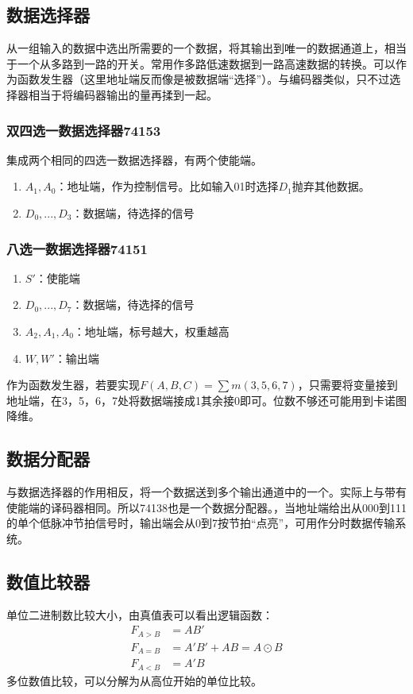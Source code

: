\documentclass{ctexart}
\begin{document}
\subsection{数据选择器}
从一组输入的数据中选出所需要的一个数据，将其输出到唯一的数据通道上，相当于一个从多路到一路的开关。常用作多路低速数据到一路高速数据的转换。可以作为函数发生器（这里地址端反而像是被数据端“选择”）。与编码器类似，只不过选择器相当于将编码器输出的量再揉到一起。
\subsubsection{双四选一数据选择器74153}集成两个相同的四选一数据选择器，有两个使能端。
\begin{enumerate}
    \item $A_1,A_0$：地址端，作为控制信号。比如输入01时选择$D_1$抛弃其他数据。
    \item $D_0,...,D_3$：数据端，待选择的信号
\end{enumerate}
\subsubsection{八选一数据选择器74151}
\begin{enumerate}
    \item $S'$：使能端
    \item $D_0,...,D_7$：数据端，待选择的信号
    \item $A_2,A_1,A_0$：地址端，标号越大，权重越高
    \item $W,W'$：输出端
\end{enumerate}
作为函数发生器，若要实现$F(A,B,C)=\sum m(3,5,6,7)$，只需要将变量接到地址端，在3，5，6，7处将数据端接成1其余接0即可。{\color{red}{注意看哪一个是高位！}}位数不够还可能用到卡诺图降维。
\subsection{数据分配器}
与数据选择器的作用相反，将一个数据送到多个输出通道中的一个。实际上与带有使能端的译码器相同。所以74138也是一个数据分配器。，当地址端给出从000到111的单个低脉冲节拍信号时，输出端会从0到7按节拍“点亮”，可用作分时数据传输系统。
\subsection{数值比较器}
单位二进制数比较大小，由真值表可以看出逻辑函数：
\begin{align}
    F_{A>B}&=AB'\\
    F_{A=B}&=A'B'+AB=A\odot B\\
    F_{A<B}&=A'B
\end{align}
多位数值比较，可以分解为从高位开始的单位比较。
\end{document}

